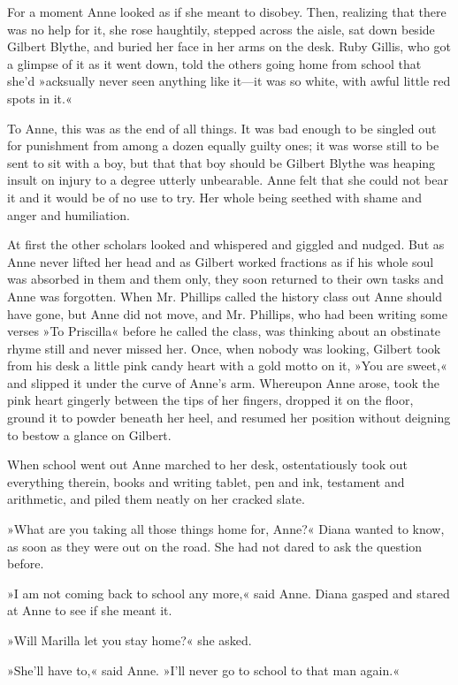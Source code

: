 For a moment Anne looked as if she meant to disobey. Then, realizing that there was no help for it, she rose haughtily, stepped across the aisle, sat down beside Gilbert Blythe, and buried her face in her arms on the desk. Ruby Gillis, who got a glimpse of it as it went down, told the others going home from school that she'd »acksually never seen anything like it—it was so white, with awful little red spots in it.«

To Anne, this was as the end of all things. It was bad enough to be singled out for punishment from among a dozen equally guilty ones; it was worse still to be sent to sit with a boy, but that that boy should be Gilbert Blythe was heaping insult on injury to a degree utterly unbearable. Anne felt that she could not bear it and it would be of no use to try. Her whole being seethed with shame and anger and humiliation.

At first the other scholars looked and whispered and giggled and nudged. But as Anne never lifted her head and as Gilbert worked fractions as if his whole soul was absorbed in them and them only, they soon returned to their own tasks and Anne was forgotten. When Mr. Phillips called the history class out Anne should have gone, but Anne did not move, and Mr. Phillips, who had been writing some verses »To Priscilla« before he called the class, was thinking about an obstinate rhyme still and never missed her. Once, when nobody was looking, Gilbert took from his desk a little pink candy heart with a gold motto on it, »You are sweet,« and slipped it under the curve of Anne's arm. Whereupon Anne arose, took the pink heart gingerly between the tips of her fingers, dropped it on the floor, ground it to powder beneath her heel, and resumed her position without deigning to bestow a glance on Gilbert.

When school went out Anne marched to her desk, ostentatiously took out everything therein, books and writing tablet, pen and ink, testament and arithmetic, and piled them neatly on her cracked slate.

»What are you taking all those things home for, Anne?« Diana wanted to know, as soon as they were out on the road. She had not dared to ask the question before.

»I am not coming back to school any more,« said Anne. Diana gasped and stared at Anne to see if she meant it.

»Will Marilla let you stay home?« she asked.

»She'll have to,« said Anne. »I'll never go to school to that man again.«

